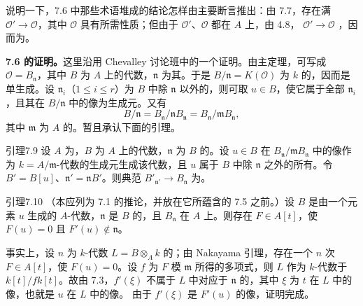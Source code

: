 说明一下，7.6 中那些术语堆成的结论怎样由主要断言推出：由 7.7，存在满 $\mathcal O'\to\mathcal O$，其中 $\mathcal O$ 具有所需性质；但由于 $\mathcal O'$、$\mathcal O$ 都在 $A$ 上，由 4.8， $\mathcal O'\to\mathcal O$ ，因而为。

\textbf{7.6 的证明。}这里沿用 Chevalley 讨论班中的一个证明。由主定理，可写成 $\mathcal O=B_{\mathfrak n}$，其中 $B$ 为 $A$ 上的代数，$\mathfrak n$ 为其。于是 $B/\mathfrak n=K(\mathcal O)$ 为 $k$ 的，因而是单生成。设 $\mathfrak n_i$（$1\leq i\leq r$）为 $B$ 中除 $\mathfrak n$ 以外的，则可取 $u\in B$，使它属于全部 $\mathfrak n_i$，且其在 $B/\mathfrak n$ 中的像为生成元。又有
\[
 B/\mathfrak n=B_{\mathfrak n}/\mathfrak n B_{\mathfrak n}
 =B_{\mathfrak n}/\mathfrak m B_{\mathfrak n},
\]
其中 $\mathfrak m$ 为 $A$ 的。暂且承认下面的引理。
\begin{SGAresult}{引理}{7.9}
设 $A$ 为，$B$ 为 $A$ 上的代数，$\mathfrak n$ 为 $B$ 的。设 $u\in B$ 在 $B_{\mathfrak n}/\mathfrak m B_{\mathfrak n}$ 中的像作为 $k=A/\mathfrak m$-代数的生成元生成该代数，且 $u$ 属于 $B$ 中除 $\mathfrak n$ 之外的所有。令 $B'=B[u]$、$\mathfrak n'=\mathfrak n B'$。则典范 $B'_{\mathfrak n'}\to B_{\mathfrak n}$ 为。
\end{SGAresult}
\begin{SGAresult}{引理}{7.10}
（本应列为 7.1 的推论，并放在它所蕴含的 7.5 之前。）设 $B$ 是由一个元素 $u$ 生成的 $A$-代数，$\mathfrak n$ 是 $B$ 的，且 $B_{\mathfrak n}$ 在 $A$ 上。则存在 $F\in A[t]$，使 $F(u)=0$ 且 $F'(u)\notin\mathfrak n$。
\end{SGAresult}
事实上，设 $n$ 为 $k$-代数 $L=B\otimes_A k$ 的；由 Nakayama 引理，存在一个 $n$ 次 $F\in A[t]$，使 $F(u)=0$。设 $f$ 为 $F$ 模 $\mathfrak m$ 所得的多项式，则 $L$ 作为 $k$-代数于 $k[t]/fk[t]$。故由 7.3，$f'(\xi)$ 不属于 $L$ 中对应于 $\mathfrak n$ 的，其中 $\xi$ 为 $t$ 在 $L$ 中的像，也就是 $u$ 在 $L$ 中的像。
由于 $f'(\xi)$ 是 $F'(u)$ 的像，证明完成。

